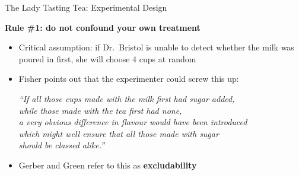 \documentclass[10pt,xcolor=table,ignorenonframetext,handout,aspectratio=169]{beamer}
\newlength{\wideitemsep}
\let\olditem\item
\renewcommand{\item}{\setlength{\itemsep}{\wideitemsep}\olditem}
\begin{document}
\begin{frame}{The Lady Tasting Tea:  Experimental Design}

\medskip
\textbf{Rule \#1:  do not confound your own treatment}

\medskip
\begin{itemize}
	
	\item Critical assumption: if Dr.~Bristol is unable to detect whether the milk was poured in first, she will choose 4 cups at random
	
	\item Fisher points out that the experimenter could screw this up:
	
	\medskip
	\begin{center}
		\emph{``If all those cups made with the milk first had sugar added, \\
			while those made with the tea first had none, \\
			a very obvious difference in flavour would have been introduced \\
			which might well ensure that all those made with sugar \\
			should be classed alike.''}
	\end{center}
	
	\pause
	\item Gerber and Green refer to this as \textbf{excludability}
	
\end{itemize}

\end{frame}


\end{document}
